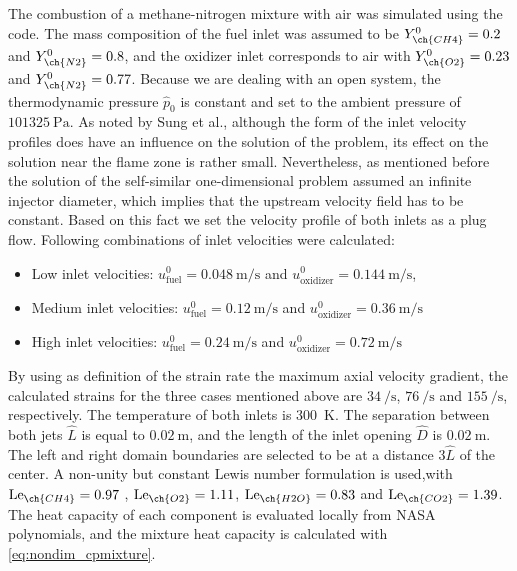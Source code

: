 {The combustion of a methane-nitrogen mixture with air was simulated using the \BoSSS code. The mass composition of the fuel inlet was assumed to be  $Y^0_{\ch{CH4}} = 0.2$ and $Y^0_{\ch{N2}} = 0.8$, and the oxidizer inlet corresponds to air with   $Y^0_{\ch{O2}} = 0.23$ and $Y^0_{\ch{N2}} = 0.77$. Because we are dealing with an open system, the thermodynamic pressure $\hat p_0$ is constant and set to the ambient pressure of $\SI{101325}{\pascal}$. As noted by Sung et al., \cite{sungStructuralResponseCounterflow1995} although the form of the inlet velocity profiles does have an influence on the solution of the problem, its effect on the solution near the flame zone is rather small. Nevertheless, as mentioned before the solution of the self-similar one-dimensional problem assumed an infinite injector diameter, which implies that the upstream velocity field has to be constant. Based on this fact we set the velocity profile of both inlets as a plug flow. Following combinations of inlet velocities were calculated:
\begin{itemize}
	\item  Low inlet velocities:  $u^0_{\text{fuel}} = \SI{0.048}{\meter \per \second}$ and  $u^0_{\text{oxidizer}} = \SI{0.144}{\meter \per \second}$,
	\item Medium inlet velocities:  $u^0_{\text{fuel}} = \SI{0.12}{\meter \per \second}$ and  $u^0_{\text{oxidizer}} = \SI{0.36}{\meter \per \second}$
	\item High inlet velocities: $u^0_{\text{fuel}}  = \SI{0.24}{\meter \per \second}$ and   $u^0_{\text{oxidizer}} = \SI{0.72}{\meter \per \second}$
\end{itemize}
By using as definition of the strain rate the maximum axial velocity gradient, the calculated strains for the three cases mentioned above are $\SI{34}{\per\second}$, $\SI{76}{\per\second}$ and $\SI{155}{\per\second}$, respectively. The temperature of both inlets is \SI{300}{\kelvin}. The separation between both jets $\hat L$ is equal to $\SI{0.02}{\meter}$, and the length of the inlet opening $\hat D$ is $\SI{0.02}{\meter}$. The left and right domain boundaries are selected to be at a distance $3\hat L$ of the center. A non-unity but constant Lewis number formulation is used,with  
$\Lewis_{\ch{CH4}} =  0.97 $ , $\Lewis_{\ch{O2}} = 1.11 $, $\Lewis_{\ch{H2O}} = 0.83 $ and $\Lewis_{\ch{CO2}} = 1.39 $.\cite{smookePremixedNonpremixedTest1991} The heat capacity of each component is evaluated locally from NASA polynomials, and the mixture heat capacity is calculated with \cref{eq:nondim_cpmixture}.
}
